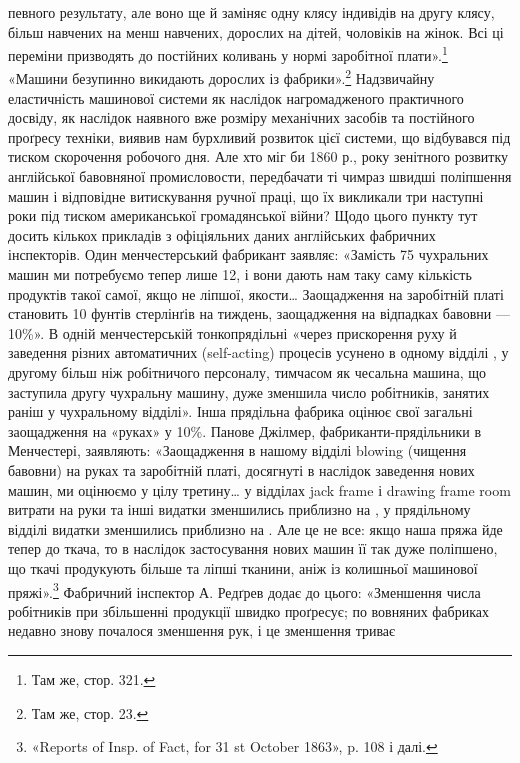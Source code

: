 певного результату, але воно ще й заміняє одну клясу індивідів
на другу клясу, більш навчених на менш навчених, дорослих
на дітей, чоловіків на жінок. Всі ці переміни призводять до постійних
коливань у нормі заробітної плати».\footnote{
Там же, стор. 321.
} «Машини безупинно
викидають дорослих із фабрики».\footnote{
Там же, стор. 23.
} Надзвичайну еластичність машинової системи як наслідок нагромадженого
практичного досвіду, як наслідок наявного вже розміру механічних
засобів та постійного проґресу техніки, виявив нам бурхливий
розвиток цієї системи, що відбувався під тиском скорочення
робочого дня. Але хто міг би 1860 р., року зенітного розвитку
англійської бавовняної промисловости, передбачати ті чимраз
швидші поліпшення машин і відповідне витискування ручної
праці, що їх викликали три наступні роки під тиском американської
громадянської війни? Щодо цього пункту тут досить кількох
прикладів з офіціяльних даних англійських фабричних інспекторів.
Один менчестерський фабрикант заявляє: «Замість 75 чухральних
машин ми потребуємо тепер лише 12, і вони дають нам
таку саму кількість продуктів такої самої, якщо не ліпшої,
якости\dots{} Заощадження на заробітній платі становить 10 фунтів
стерлінґів на тиждень, заощадження на відпадках бавовни — 10\%».
В одній менчестерській тонкопрядільні «через прискорення руху
й заведення різних автоматичних (self-acting) процесів усунено
в одному відділі , у другому більш ніж  робітничого
персоналу, тимчасом як чесальна машина, що заступила другу чухральну
машину, дуже зменшила число робітників, занятих раніш у чухральному
відділі». Інша прядільна фабрика оцінює свої загальні заощадження
на «руках» у 10\%. Панове Джілмер, фабриканти-прядільники
в Менчестері, заявляють: «Заощадження в нашому відділі
blowing (чищення бавовни) на руках та заробітній платі, досягнуті
в наслідок заведення нових машин, ми оцінюємо у цілу третину\dots{}
у відділах jack frame і drawing frame room витрати на руки та інші
видатки зменшились приблизно на , у прядільному відділі видатки
зменшились приблизно на . Але це не все: якщо наша пряжа
йде тепер до ткача, то в наслідок застосування нових машин її
так дуже поліпшено, що ткачі продукують більше та ліпші тканини,
аніж із колишньої машинової пряжі».\footnote{
«Reports of Insp. of Fact, for 31 st October 1863», p. 108 і далі.
} Фабричний інспектор
А. Редґрев додає до цього: «Зменшення числа робітників
при збільшенні продукції швидко проґресує; по вовняних фабриках
недавно знову почалося зменшення рук, і це зменшення триває
